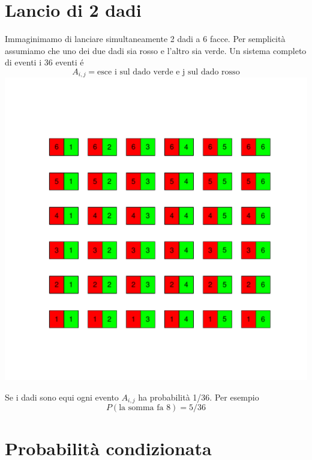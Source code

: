 \documentclass[onecolumn,12pt]{book}\usepackage[]{graphicx}\usepackage[]{color}
\makeatletter
\def\maxwidth{ %
  \ifdim\Gin@nat@width>\linewidth
    \linewidth
  \else
    \Gin@nat@width
  \fi
}
\newenvironment{knitrout}{}{} %
\makeatother
\begin{document}
\section{Lancio di 2 dadi}
Immaginimamo di lanciare simultaneamente 2 dadi a 6 facce.
Per semplicità assumiamo che uno dei due dadi sia rosso e l'altro sia verde.
Un  sistema completo di eventi i 36 eventi é 
$$A_{i,j}=\textrm{esce i sul dado verde e j sul dado rosso}$$ 
\begin{knitrout}
\color{fgcolor}
\includegraphics[width=\maxwidth]{figure/unnamed-chunk-5-1} 

\end{knitrout}
Se i dadi sono equi ogni evento  $A_{i,j}$ ha probabilità  1/36. 
Per esempio
$$P(\textrm{la somma fa 8})=5/36$$
 
 
\section{Probabilità condizionata}
\end{document}
